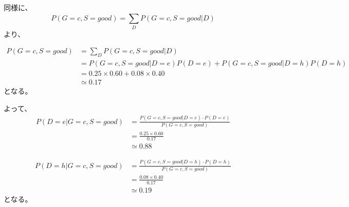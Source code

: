 \documentclass[a4paper,11pt,dvipdfmx]{jsarticle}
\begin{document}
同様に、
\[P(G=c,S=good) = \sum_{D}^{}P(G=c,S=good|D)\]
より、

\begin{align*}
    P(G=c,S=good)  &= \sum_{D}^{}P(G=c,S=good|D)\\
                    &= P(G=c,S=good|D=e)P(D=e) + P(G=c,S=good|D=h)P(D=h)\\
                    &= 0.25 \times 0.60 + 0.08 \times 0.40\\
                    &\simeq 0.17
\end{align*}
となる。

よって、
\begin{align*}
    P(D = e|G=c,S=good)    &= \frac{P(G=c,S=good|D = e) \cdot P(D = e)}{P(G=c,S=good)}\\
                            &= \frac{0.25 \times 0.60}{0.17}\\
                            &\simeq 0.88
\end{align*}

\begin{align*}
    P(D = h|G=c,S=good)    &= \frac{P(G=c,S=good|D = h) \cdot P(D = h)}{P(G=c,S=good)}\\
                            &= \frac{0.08 \times 0.40}{0.17}\\
                            &\simeq 0.19
\end{align*}
となる。
\end{document}
